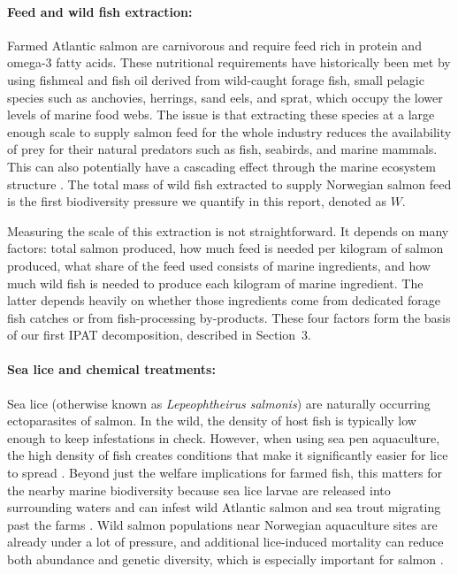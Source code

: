 \documentclass[12pt, a4paper]{report}
\begin{document}
\paragraph{Feed and wild fish extraction:}
Farmed Atlantic salmon are carnivorous and require feed rich in protein and omega-3 fatty acids. These nutritional requirements have historically been met by using fishmeal and fish oil derived from wild-caught forage fish, small pelagic species such as anchovies, herrings, sand eels, and sprat, which occupy the lower levels of marine food webs. The issue is that extracting these species at a large enough scale to supply salmon feed for the whole industry reduces the availability of prey for their natural predators such as fish, seabirds, and marine mammals. This can also potentially have a cascading effect through the marine ecosystem structure \citep{tacon2008, oceanconservation}. The total mass of wild fish extracted to supply Norwegian salmon feed is the first biodiversity pressure we quantify in this report, denoted as \(W\).

Measuring the scale of this extraction is not straightforward. It depends on many factors: total salmon produced, how much feed is needed per kilogram of salmon produced, what share of the feed used consists of marine ingredients, and how much wild fish is needed to produce each kilogram of marine ingredient. The latter depends heavily on whether those ingredients come from dedicated forage fish catches or from fish-processing by-products. These four factors form the basis of our first IPAT decomposition, described in Section~3.

\paragraph{Sea lice and chemical treatments:}
Sea lice (otherwise known as \textit{Lepeophtheirus salmonis}) are naturally occurring ectoparasites of salmon. In the wild, the density of host fish is typically low enough to keep infestations in check. However, when using sea pen aquaculture, the high density of fish creates conditions that make it significantly easier for lice to spread \citep{nhm2024}. Beyond just the welfare implications for farmed fish, this matters for the nearby marine biodiversity because sea lice larvae are released into surrounding waters and can infest wild Atlantic salmon and sea trout migrating past the farms \citep{plos2018}. Wild salmon populations near Norwegian aquaculture sites are already under a lot of pressure, and additional lice-induced mortality can reduce both abundance and genetic diversity, which is especially important for salmon \citep{nhm2024}.
\end{document}
